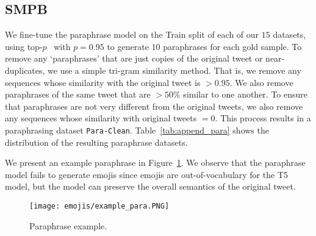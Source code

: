 \subsection{SMPB}
We fine-tune the paraphrase model on the Train split of each of our $15$ datasets, using top-$p$~\cite{holtzman2019curious} with $p=0.95$ to generate $10$ paraphrases for each gold sample. To remove any `paraphrases' that are just copies of the original tweet or near-duplicates, we use a simple tri-gram similarity method. That is, we remove any sequences whose similarity with the original tweet is $> 0.95$. We also remove paraphrases of the same tweet that are $> 50\%$ similar to one another. To ensure that paraphrases are not very different from the original tweets, we also remove any sequences whose similarity with original tweets $=0$. This process results in a paraphrasing dataset \texttt{Para-Clean}. Table~\ref{tab:append_para} shows the distribution of the resulting paraphrase datasets.  %


\vspace{-5pt}
We present an example paraphrase in Figure~\ref{fig:para}. We observe that the paraphrase model fails to generate emojis since emojis are out-of-vocabulary for the T5 model, but the model can preserve the overall semantics of the original tweet.
\begin{figure}[h]
\begin{centering}
 \texttt{[image: emojis/example\_para.PNG]}\vspace{-7pt}
  \caption{Paraphrase example.} \vspace{-10pt}
  \label{fig:para}
\end{centering}
\end{figure}




